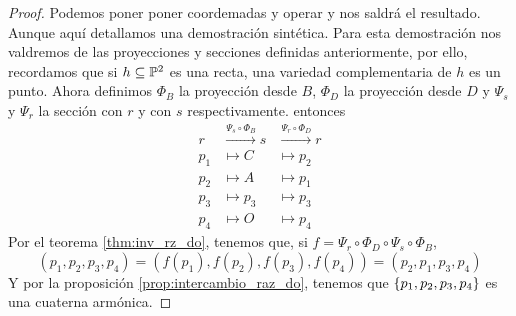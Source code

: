 \begin{proof}
 Podemos poner poner coordemadas y operar y nos saldrá el resultado. Aunque aquí detallamos una demostración
 sintética. Para esta demostración nos valdremos de las proyecciones y secciones definidas anteriormente, por
 ello, recordamos que si $h \subseteq \mathbb{P}^2$ es una recta, una variedad complementaria de $h$ es un punto. Ahora
 definimos $\Phi_B$ la proyección desde $B$, $\Phi_D$ la proyección desde $D$ y $\Psi_s$ y $\Psi_r$ la sección
 con $r$ y con $s$ respectivamente. entonces
 \[
  \begin{array}{ccc}
   r & \stackrel{\Psi_s \circ \Phi_B}{\to} s & \stackrel{\Psi_r \circ \Phi_D}{\to} r \\
   p_1 &\mapsto C &\mapsto p_2 \\
   p_2 &\mapsto A &\mapsto p_1 \\
   p_3 &\mapsto p_3 &\mapsto p_3 \\
   p_4 &\mapsto O &\mapsto p_4
  \end{array}
 \]
 Por el teorema \ref{thm:inv_rz_do}, tenemos que, si $f = \Psi_r \circ \Phi_D \circ \Psi_s \circ \Phi_B$,
 \[
  (p_1,p_2,p_3,p_4) = \left( f(p_1), f(p_2), f(p_3), f(p_4) \right) = (p_2,p_1,p_3,p_4)
 \]
 Y por la proposición \ref{prop:intercambio_raz_do}, tenemos que $\left\{p_1,p_2,p_3,p_4\right\}$ es una cuaterna
 armónica.
\end{proof}
